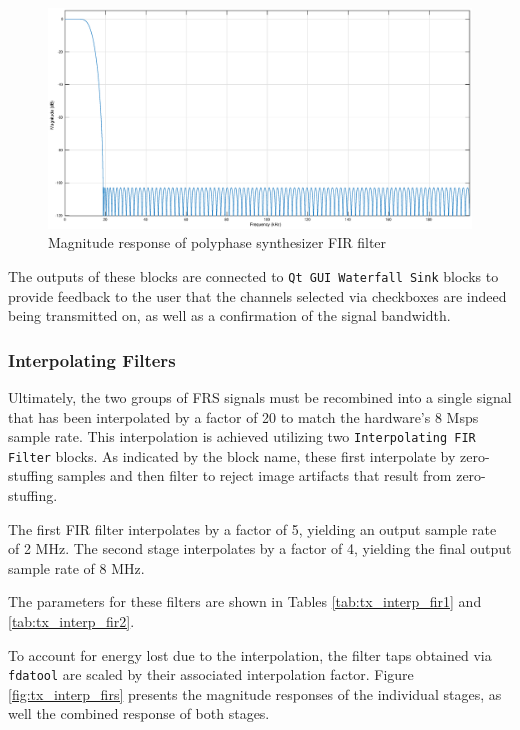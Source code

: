 \begin{figure}[h]
  \centering
  \includegraphics[width=6in]{images/frs/filter/tx/polyphase-synth-fir.eps}
  \caption{Magnitude response of polyphase synthesizer FIR filter}
  \label{fig:filtresp_tx_ps}
\end{figure}

The outputs of these blocks are connected to \texttt{Qt GUI Waterfall Sink}
blocks to provide feedback to the user that the channels selected via
checkboxes are indeed being transmitted on, as well as a confirmation of the
signal bandwidth.

\subsubsection{Interpolating Filters}

Ultimately, the two groups of \ac{FRS} signals must be recombined into a single
signal that has been interpolated by a factor of 20 to match the hardware's 8 Msps
sample rate.  This interpolation is achieved utilizing two
\texttt{Interpolating \ac{FIR} Filter} blocks. As indicated by the block name,
these first interpolate by zero-stuffing samples and then filter to reject
image artifacts that result from zero-stuffing.

The first \ac{FIR} filter interpolates by a factor of 5, yielding an output
sample rate of 2 MHz. The second stage interpolates by a factor of 4, yielding
the final output sample rate of 8 MHz.

The parameters for these filters are shown in Tables \ref{tab:tx_interp_fir1}
and \ref{tab:tx_interp_fir2}.

To account for energy lost due to the interpolation, the filter taps obtained
via \texttt{fdatool} are scaled by their associated interpolation factor. Figure
\ref{fig:tx_interp_firs} presents the magnitude responses of the individual
stages, as well the combined response of both stages.

